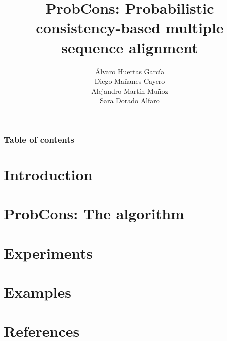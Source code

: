 \documentclass[11pt]{beamer}
\title[ProbCons]{ProbCons: Probabilistic consistency-based multiple sequence alignment}
\author[PCALG - Presentation]{Álvaro Huertas García \\ Diego Mañanes Cayero
                 \\ Alejandro Martín Muñoz \\ Sara Dorado Alfaro}
\begin{document}
\frame{\titlepage}
\begin{frame}
    \frametitle{Table of contents}
    \tableofcontents
\end{frame}


\section{Introduction} 


\section{ProbCons: The algorithm}


\section{Experiments}


\section{Examples} 


\section{References}


\frame{\titlepage}
\end{document}
